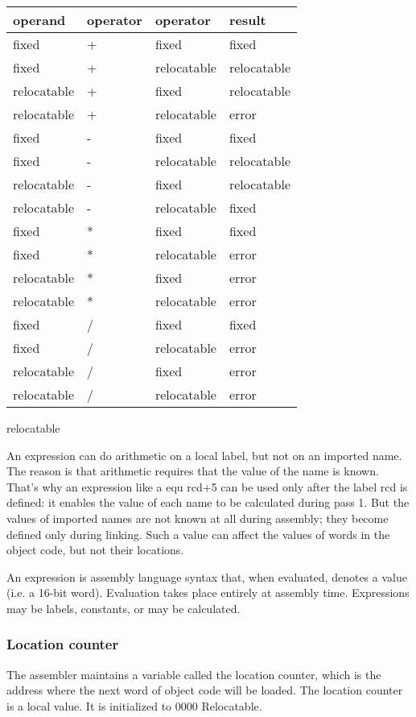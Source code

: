 \documentclass[11pt]{article}
\begin{document}
\begin{center}
\begin{tabular}{llll}
\hline
operand & operator & operator & result\\
\hline
fixed & + & fixed & fixed\\
fixed & + & relocatable & relocatable\\
relocatable & + & fixed & relocatable\\
relocatable & + & relocatable & error\\
\hline
fixed & - & fixed & fixed\\
fixed & - & relocatable & relocatable\\
relocatable & - & fixed & relocatable\\
relocatable & - & relocatable & fixed\\
\hline
fixed & * & fixed & fixed\\
fixed & * & relocatable & error\\
relocatable & * & fixed & error\\
relocatable & * & relocatable & error\\
\hline
fixed & / & fixed & fixed\\
fixed & / & relocatable & error\\
relocatable & / & fixed & error\\
relocatable & / & relocatable & error\\
\hline
\end{tabular}
\end{center}


relocatable 


An expression can do arithmetic on a local label, but not on an
imported name.  The reason is that arithmetic requires that the value
of the name is known.  That's why an expression like a equ rcd+5 can
be used only after the label rcd is defined: it enables the value of
each name to be calculated during pass 1.  But the values of imported
names are not known at all during assembly; they become defined only
during linking.  Such a value can affect the values of words in the
object code, but not their locations.

An expression is assembly language syntax that, when evaluated,
denotes a value (i.e. a 16-bit word).  Evaluation takes place entirely
at assembly time.  Expressions may be labels, constants, or
may be calculated.

\subsubsection*{Location counter}
\label{sec:org5b0e833}
The assembler maintains a variable called the location counter, which
is the address where the next word of object code will be loaded.  The
location counter is a local value.  It is initialized to 0000
Relocatable.
\end{document}
